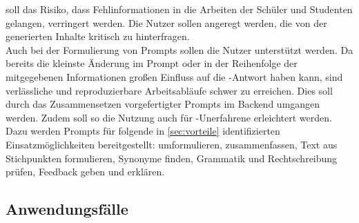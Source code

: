 \documentclass[../main.tex]{subfiles}
\begin{document}
soll das Risiko, dass Fehlinformationen in die Arbeiten der Schüler und Studenten gelangen, verringert werden. Die Nutzer sollen angeregt werden, die von der  generierten Inhalte 
kritisch zu hinterfragen.\\
Auch bei der Formulierung von Prompts sollen die Nutzer unterstützt werden. Da bereits die kleinste Änderung im Prompt oder in der Reihenfolge der mitgegebenen Informationen großen 
Einfluss auf die -Antwort haben kann, sind verlässliche und reproduzierbare Arbeitsabläufe schwer zu erreichen\cite{creativeWriting}. Dies soll durch das Zusammensetzen vorgefertigter 
Prompts im Backend umgangen werden. Zudem soll so die Nutzung auch für -Unerfahrene erleichtert werden. Dazu werden Prompts für folgende in \autoref{sec:vorteile} identifizierten 
Einsatzmöglichkeiten bereitgestellt: umformulieren, zusammenfassen, Text aus Stichpunkten formulieren, Synonyme finden, Grammatik und Rechtschreibung prüfen, Feedback geben und 
erklären.


\subsection{Anwendungsfälle}
\end{document}
